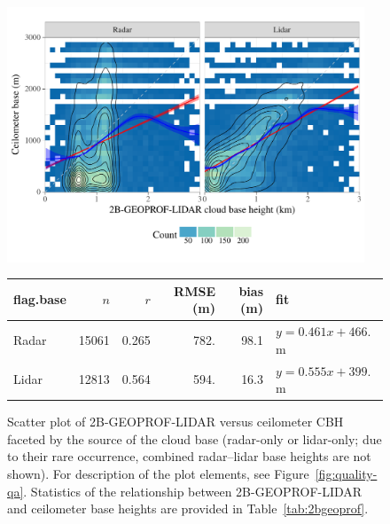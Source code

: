 \documentclass[essd,manuscript]{copernicus}\usepackage[]{graphicx}\usepackage[]{color}
\newenvironment{knitrout}{}{} %
\begin{document}

\begin{figure}
  \centering

\begin{knitrout}
\color{fgcolor}

{\centering \includegraphics[width=0.95\textwidth]{figure/method-eval-2bgeoprof-1} 

}



\end{knitrout}
\begin{tabular}{lrrrrl}
  \hline
\hline
flag.base & $n$ & $r$ & RMSE (m) & bias (m) & fit \\ 
  \hline
Radar & 15061 & 0.265 & 782. & 98.1 & $y = 0.461 x + 466.$ m \\ 
  Lidar & 12813 & 0.564 & 594. & 16.3 & $y = 0.555 x + 399.$ m \\ 
   \hline
\hline
\end{tabular}

  \caption{Scatter plot of 2B-GEOPROF-LIDAR versus ceilometer CBH
    faceted by the source of the cloud base (radar-only or lidar-only; due to
    their rare occurrence, combined radar--lidar base heights are not shown).
    For description of the plot elements, see Figure~\ref{fig:quality-qa}.  Statistics of the
    relationship between 2B-GEOPROF-LIDAR and ceilometer base heights are provided in
    Table~\ref{tab:2bgeoprof}.}
  \label{fig:eval-2b}
\end{figure}
\end{document}
